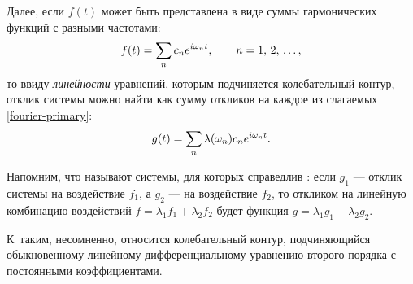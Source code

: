 Далее, если $f(t)$ может быть представлена в виде суммы гармонических функций
с разными частотами:
\begin{equation}
\eqmark{fourier-primary}
f(t) = \sum_n c_n e^{i\omega_n t},\qquad n=1,\,2,\,\ldots,
\end{equation}
то ввиду \emph{линейности} уравнений, которым подчиняется колебательный
контур, отклик системы можно найти как сумму откликов на каждое из 
слагаемых \eqref{fourier-primary}:
\begin{equation}
 \eqmark{fourier-secondary}
 g(t) = \sum_n \lambda(\omega_n) c_n e^{i\omega_n t}.
\end{equation}
\vspace*{-1pc}

\begin{lab:note}
Напомним, что  называют системы, для которых справедлив 
: если $g_1$ --- отклик системы на воздействие 
$f_1$, а $g_2$ --- на воздействие $f_2$, то откликом на линейную комбинацию
воздействий $f=\lambda_1 f_1 + \lambda_2 f_2$ будет функция 
$g=\lambda_1 g_1 + \lambda_2 g_2$.

К~таким, несомненно, относится колебательный контур, подчиняющийся обыкновенному 
линейному дифференциальному уравнению второго порядка с постоянными коэффициентами.
\end{lab:note}






